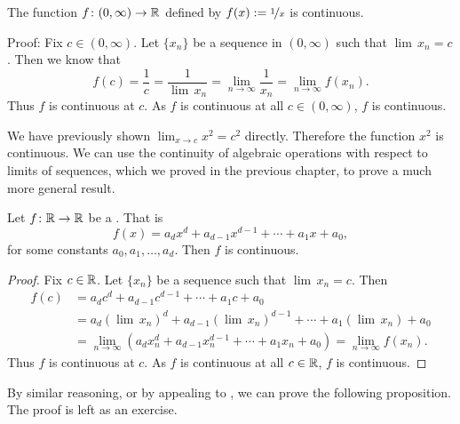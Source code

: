 \begin{example}
The function $f \colon (0,\infty) \to {\mathbb{R}}$ defined by
$f(x) := \nicefrac{1}{x}$ is continuous.

Proof: Fix $c \in (0,\infty)$.  
Let $\{ x_n \}$ be a sequence in $(0,\infty)$ such that
$\lim\, x_n = c$.  Then we know that
\begin{equation*}
f(c) = \frac{1}{c}
=
\frac{1}{\lim\, x_n}
=
\lim_{n \to \infty} \frac{1}{x_n}
=
\lim_{n \to \infty} f(x_n) .
\end{equation*}
Thus $f$ is continuous at $c$.  As $f$ is continuous at all $c \in
(0,\infty)$, $f$ is continuous.
\end{example}

We have previously shown $\lim_{x \to c} x^2 = c^2$ directly.  Therefore
the function $x^2$ is continuous.  We can use the continuity of
algebraic operations with respect to limits of sequences, which we proved in
the previous chapter, to prove a much more general result.

\begin{prop}
Let $f \colon {\mathbb{R}} \to {\mathbb{R}}$ be a \emph{}.  That is
\begin{equation*}
f(x) = a_d x^d + a_{d-1} x^{d-1} + \cdots + a_1 x + a_0 ,
\end{equation*}
for some constants $a_0, a_1, \ldots, a_d$.
Then $f$ is continuous.
\end{prop}

\begin{proof}
Fix $c \in {\mathbb{R}}$.  
Let $\{ x_n \}$ be a sequence such that
$\lim\, x_n = c$.  Then
\begin{equation*}
\begin{split}
f(c) &=
a_d c^d + a_{d-1} c^{d-1} + \cdots + a_1 c + a_0 
\\
&= 
a_d {(\lim\, x_n)}^d + a_{d-1} {(\lim\, x_n)}^{d-1} + \cdots + a_1 (\lim\, x_n) + a_0 
\\
& =
\lim_{n \to \infty}
\left(
a_d x_n^d + a_{d-1} x_n^{d-1} + \cdots + a_1 x_n + a_0 
\right)
=
\lim_{n \to \infty}
f(x_n) .
\end{split}
\end{equation*}
Thus $f$ is continuous at $c$.  As $f$ is continuous at all $c \in {\mathbb{R}}$,
$f$ is continuous.
\end{proof}

By similar reasoning, or by appealing to ,
we can prove the following proposition.  The proof is left as an
exercise.


